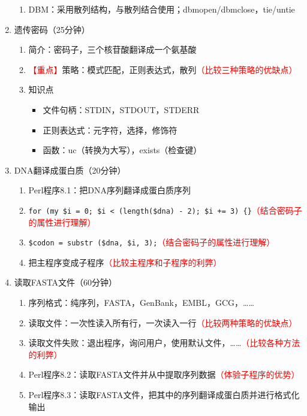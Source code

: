 \documentclass{TIJMUjiaoanLL}
\begin{document}
\begin{enumerate}
\begin{enumerate}
      \item DBM：采用散列结构，与散列结合使用；dbmopen/dbmclose，tie/untie
    \end{enumerate}
  \item 遗传密码（25分钟）
    \begin{enumerate}
      \item 简介：密码子，三个核苷酸翻译成一个氨基酸
      \item \textcolor{red}{【重点】}策略：模式匹配，正则表达式，散列\textcolor{red}{（比较三种策略的优缺点）}
      \item 知识点
	\begin{itemize}
	  \item 文件句柄：STDIN，STDOUT，STDERR
	  \item 正则表达式：元字符，选择，修饰符
	  \item 函数：uc（转换为大写），exists（检查键）
	\end{itemize}
    \end{enumerate}
  \item DNA翻译成蛋白质（20分钟）
    \begin{enumerate}
      \item Perl程序8.1：把DNA序列翻译成蛋白质序列
      \item \verb|for (my $i = 0; $i < (length($dna) - 2); $i += 3) {}|\textcolor{red}{（结合密码子的属性进行理解）}
      \item \verb|$codon = substr ($dna, $i, 3);|\textcolor{red}{（结合密码子的属性进行理解）}
      \item 把主程序变成子程序\textcolor{red}{（比较主程序和子程序的利弊）}
    \end{enumerate}
  \item 读取FASTA文件（60分钟）
    \begin{enumerate}
      \item 序列格式：纯序列，FASTA，GenBank，EMBL，GCG，……
      \item 读取文件：一次性读入所有行，一次读入一行\textcolor{red}{（比较两种策略的优缺点）}
      \item 读取文件失败：退出程序，询问用户，使用默认文件，……\textcolor{red}{（比较各种方法的利弊）}
      \item Perl程序8.2：读取FASTA文件并从中提取序列数据\textcolor{red}{（体验子程序的优势）}
      \item Perl程序8.3：读取FASTA文件，把其中的序列翻译成蛋白质并进行格式化输出

\end{enumerate}
\end{enumerate}
\end{document}
